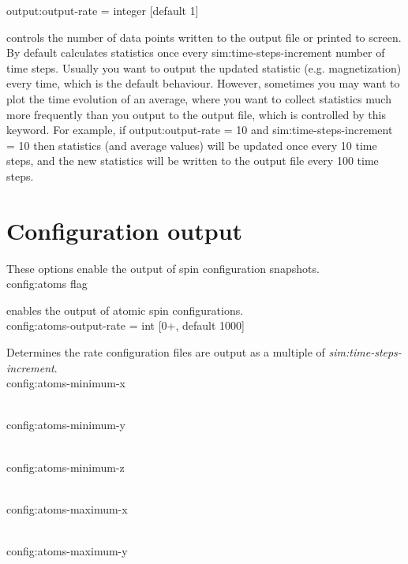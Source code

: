 {\zicf output:output-rate = integer [default 1]} controls the number of data points written to the output file or printed to screen. By default \vampire calculates statistics once every sim:time-steps-increment number of time steps. Usually you want to output the updated statistic (e.g. magnetization) every time, which is the default behaviour. However, sometimes you may want to plot the time evolution of an average, where you want to collect statistics much more frequently than you output to the output file, which is controlled by this keyword. For example, if output:output-rate = 10 and sim:time-steps-increment = 10 then statistics (and average values) will be updated once every 10 time steps, and the new statistics will be written to the output file every 100 time steps.\\

\section*{Configuration output}
These options enable the output of spin configuration snapshots.\\

{\zicf config:atoms flag} enables the output of atomic spin configurations.\\

{\zicf config:atoms-output-rate = int [0+, default 1000]} Determines the rate configuration files are output as a multiple of \textit{sim:time-steps-increment}.\\

{\zicf config:atoms-minimum-x}\\

{\zicf config:atoms-minimum-y}\\

{\zicf config:atoms-minimum-z}\\

{\zicf config:atoms-maximum-x}\\

{\zicf config:atoms-maximum-y}\\

